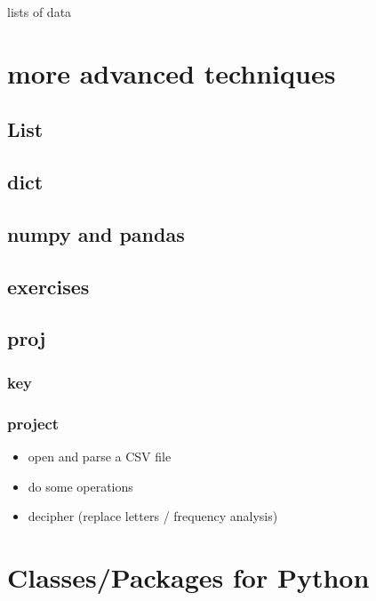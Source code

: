 \documentclass[
]{book}
\providecommand{\tightlist}{%
  \setlength{\itemsep}{0pt}\setlength{\parskip}{0pt}}
\begin{document}
lists of data

\hypertarget{more-advanced-techniques}{%
\chapter{more advanced techniques}\label{more-advanced-techniques}}

\hypertarget{list}{%
\section{List}\label{list}}

\hypertarget{dict}{%
\section{dict}\label{dict}}

\hypertarget{numpy-and-pandas}{%
\section{numpy and pandas}\label{numpy-and-pandas}}

\hypertarget{exercises-1}{%
\section{exercises}\label{exercises-1}}

\hypertarget{proj}{%
\section{proj}\label{proj}}

\hypertarget{key}{%
\subsection{key}\label{key}}

\hypertarget{project}{%
\subsection{project}\label{project}}

\begin{itemize}
\tightlist
\item
  open and parse a CSV file
\item
  do some operations
\item
  decipher (replace letters / frequency analysis)
\end{itemize}

\hypertarget{classespackages-for-python}{%
\chapter{Classes/Packages for Python}\label{classespackages-for-python}}
\end{document}
